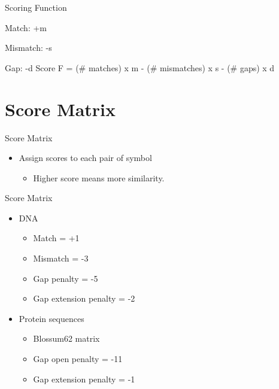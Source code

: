 \documentclass{bredelebeamer}
\begin{document}
\begin{frame}{Scoring Function}
    \par Match: \quad+m\linebreak
    \par Mismatch: \quad-s\linebreak
    \par Gap: \quad-d
    \linebreak
    \linebreak
    \linebreak
    Score F = (\# matches) x m - (\# mismatches) x s - (\# gaps) x d
\end{frame}
\section{Score Matrix}
\begin{frame}{}
    \tableofcontents[currentsection]
\end{frame}
\begin{frame}{Score Matrix}
   \begin{itemize}
   \item Assign scores to each pair of symbol
\begin{itemize}
 \item   Higher score means more similarity.
   \end{itemize} 
   \end{itemize} 
\end{frame}
\begin{frame}{Score Matrix}
\begin{itemize}
       \item DNA
\begin{itemize}
       \item  Match = +1
        \item  Mismatch = -3
         \item   Gap penalty = -5
          \item  Gap extension penalty = -2

   \end{itemize} 
   \item Protein sequences
\begin{itemize}
 \item Blossum62 matrix
         \item   Gap open penalty = -11
          \item  Gap extension penalty = -1
   \end{itemize} 
   \end{itemize}
\end{frame}
\end{document}
